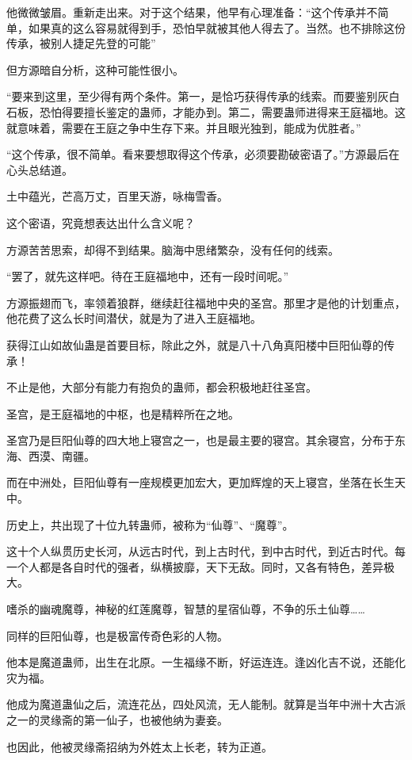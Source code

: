 \begin{this_body}
他微微皱眉。重新走出来。对于这个结果，他早有心理准备：“这个传承并不简单，如果真的这么容易就得到手，恐怕早就被其他人得去了。当然。也不排除这份传承，被别人捷足先登的可能”

但方源暗自分析，这种可能性很小。

“要来到这里，至少得有两个条件。第一，是恰巧获得传承的线索。而要鉴别灰白石板，恐怕得要擅长鉴定的蛊师，才能办到。第二，需要蛊师进得来王庭福地。这就意味着，需要在王庭之争中生存下来。并且眼光独到，能成为优胜者。”

“这个传承，很不简单。看来要想取得这个传承，必须要勘破密语了。”方源最后在心头总结道。

土中蕴光，芒高万丈，百里天游，咏梅雪香。

这个密语，究竟想表达出什么含义呢？

方源苦苦思索，却得不到结果。脑海中思绪繁杂，没有任何的线索。

“罢了，就先这样吧。待在王庭福地中，还有一段时间呢。”

方源振翅而飞，率领着狼群，继续赶往福地中央的圣宫。那里才是他的计划重点，他花费了这么长时间潜伏，就是为了进入王庭福地。

获得江山如故仙蛊是首要目标，除此之外，就是八十八角真阳楼中巨阳仙尊的传承！

不止是他，大部分有能力有抱负的蛊师，都会积极地赶往圣宫。

圣宫，是王庭福地的中枢，也是精粹所在之地。

圣宫乃是巨阳仙尊的四大地上寝宫之一，也是最主要的寝宫。其余寝宫，分布于东海、西漠、南疆。

而在中洲处，巨阳仙尊有一座规模更加宏大，更加辉煌的天上寝宫，坐落在长生天中。

历史上，共出现了十位九转蛊师，被称为“仙尊”、“魔尊”。

这十个人纵贯历史长河，从远古时代，到上古时代，到中古时代，到近古时代。每一个人都是各自时代的强者，纵横披靡，天下无敌。同时，又各有特色，差异极大。

嗜杀的幽魂魔尊，神秘的红莲魔尊，智慧的星宿仙尊，不争的乐土仙尊……

同样的巨阳仙尊，也是极富传奇色彩的人物。

他本是魔道蛊师，出生在北原。一生福缘不断，好运连连。逢凶化吉不说，还能化灾为福。

他成为魔道蛊仙之后，流连花丛，四处风流，无人能制。就算是当年中洲十大古派之一的灵缘斋的第一仙子，也被他纳为妻妾。

也因此，他被灵缘斋招纳为外姓太上长老，转为正道。


\end{this_body}
